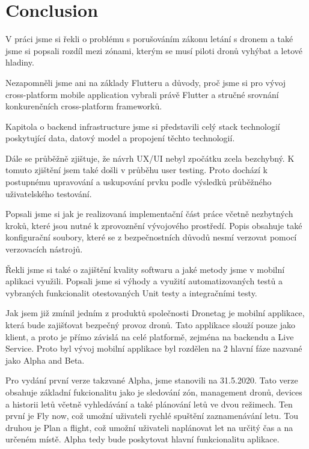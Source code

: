 \chapter{Conclusion}\label{ch:conclusion}

V práci jsme si řekli o problému s porušováním zákonu letání s dronem a také jsme si popsali rozdíl mezi zónami, kterým se musí piloti dronů vyhýbat a letové hladiny.

Nezapomněli jsme ani na základy Flutteru a důvody, proč jsme si pro vývoj cross-platform mobile application vybrali právě Flutter a stručné srovnání konkurenčních cross-platform frameworků.


Kapitola o backend infrastructure jsme si představili celý stack technologií poskytující data, datový model a propojení těchto technologií.

Dále se průběžně zjištuje, že návrh UX/UI nebyl zpočátku zcela bezchybný.
K tomuto zjištění jsem také došli v průběhu user testing.
Proto dochází k postupnému upravování a uskupování prvku podle výsledků průběžného uživatelského testování.

Popsali jsme si jak je realizovaná implementační část práce včetně nezbytných kroků, které jsou nutné k zprovoznění vývojového prostředí.
Popis obsahuje také konfigurační soubory, které se z bezpečnostních důvodů nesmí verzovat pomocí verzovacích nástrojů.

Řekli jsme si také o zajištění kvality softwaru a jaké metody jsme v mobilní aplikaci využili.
Popsali jsme si výhody a využití automatizovaných testů a vybraných funkcionalit otestovaných Unit testy a integračními testy.

Jak jsem již zmínil jedním z produktů společnosti Dronetag je mobilní applikace, která bude zajišťovat bezpečný provoz dronů.
Tato applikace slouží pouze jako klient, a proto je přímo závislá na celé platformě, zejména na backendu a Live Service.
Proto byl vývoj mobilní applikace byl rozdělen na 2 hlavní fáze nazvané jako Alpha and Beta.

Pro vydání první verze takzvané Alpha, jsme stanovili na 31.5.2020.
Tato verze obsahuje základní fukcionalitu jako je sledování zón, management dronů, devices a historii letů včetně vyhledávání a také plánování letů ve dvou režimech.
Ten první je Fly now, což umožní uživateli rychlé spuštění zaznamenávání letu.
Tou druhou je Plan a flight, což umožní uživateli naplánovat let na určitý čas a na určeném místě.
Alpha tedy bude poskytovat hlavní funkcionalitu aplikace.

